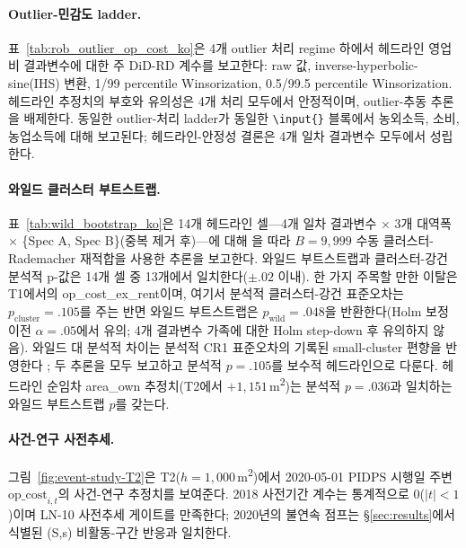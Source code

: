 \documentclass[12pt, a4paper]{article}
\begin{document}
\paragraph{Outlier-민감도 ladder.} 표~\ref{tab:rob_outlier_op_cost_ko}은 4개 outlier 처리 regime 하에서 헤드라인 영업비 결과변수에 대한 주 DiD-RD 계수를 보고한다: raw 값, inverse-hyperbolic-sine(IHS) 변환, 1/99 percentile Winsorization, 0.5/99.5 percentile Winsorization. 헤드라인 추정치의 부호와 유의성은 4개 처리 모두에서 안정적이며, outlier-추동 추론을 배제한다. 동일한 outlier-처리 ladder가 동일한 \texttt{\textbackslash input\{\}} 블록에서 농외소득, 소비, 농업소득에 대해 보고된다; 헤드라인-안정성 결론은 4개 일차 결과변수 모두에서 성립한다.



\paragraph{와일드 클러스터 부트스트랩.} 표~\ref{tab:wild_bootstrap_ko}은 14개 헤드라인 셀---4개 일차 결과변수 $\times$ 3개 대역폭 $\times$ \{Spec A, Spec B\}(중복 제거 후)---에 대해 \citet{CameronGelbachMiller2008_clusterboot}을 따라 $B = 9{,}999$ 수동 클러스터-Rademacher 재적합을 사용한 추론을 보고한다. 와일드 부트스트랩과 클러스터-강건 분석적 p-값은 14개 셀 중 13개에서 일치한다($\pm .02$ 이내). 한 가지 주목할 만한 이탈은 T1에서의 op\_cost\_ex\_rent이며, 여기서 분석적 클러스터-강건 표준오차는 $p_{\text{cluster}} = .105$를 주는 반면 와일드 부트스트랩은 $p_{\text{wild}} = .048$을 반환한다(Holm 보정 이전 $\alpha = .05$에서 유의; 4개 결과변수 가족에 대한 Holm step-down 후 유의하지 않음). 와일드 대 분석적 차이는 분석적 CR1 표준오차의 기록된 small-cluster 편향을 반영한다 \citep{CameronGelbachMiller2008_clusterboot}; 두 추론을 모두 보고하고 분석적 $p = .105$를 보수적 헤드라인으로 다룬다. 헤드라인 순임차 area\_own 추정치(T2에서 $+1{,}151$\,m\textsuperscript{2})는 분석적 $p = .036$과 일치하는 와일드 부트스트랩 $p$를 갖는다.



\paragraph{사건-연구 사전추세.} 그림~\ref{fig:event-study-T2}은 T2($h = 1{,}000$\,m\textsuperscript{2})에서 2020-05-01 PIDPS 시행일 주변 $\text{op\_cost}_{i,t}$의 사건-연구 추정치를 보여준다. 2018 사전기간 계수는 통계적으로 0($|t| < 1$)이며 LN-10 사전추세 게이트를 만족한다; 2020년의 불연속 점프는 \S\ref{sec:results}에서 식별된 (S,s) 비활동-구간 반응과 일치한다.
\end{document}
